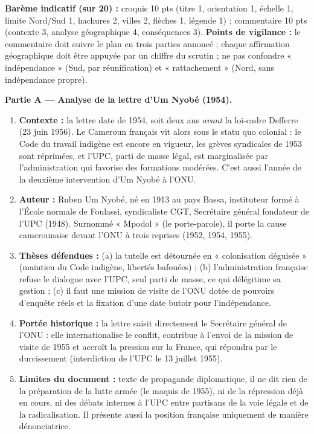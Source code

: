 \documentclass[11pt]{article}
\begin{document}
\begin{corrige}
\textbf{Barème indicatif (sur 20) :} croquis 10 pts (titre 1, orientation 1, échelle 1, limite Nord/Sud 1, hachures 2, villes 2, flèches 1, légende 1) ; commentaire 10 pts (contexte 3, analyse géographique 4, conséquences 3).
\textbf{Points de vigilance :} le commentaire doit suivre le plan en trois parties annoncé ; chaque affirmation géographique doit être appuyée par un chiffre du scrutin ; ne pas confondre « indépendance » (Sud, par réunification) et « rattachement » (Nord, sans indépendance propre).
\end{corrige}

\begin{corrige}
\textbf{Partie A — Analyse de la lettre d'Um Nyobé (1954).}
\begin{enumerate}
\item \textbf{Contexte :} la lettre date de 1954, soit deux ans \emph{avant} la loi-cadre Defferre (23 juin 1956). Le Cameroun français vit alors sous le statu quo colonial : le Code du travail indigène est encore en vigueur, les grèves syndicales de 1953 sont réprimées, et l'UPC, parti de masse légal, est marginalisée par l'administration qui favorise des formations modérées. C'est aussi l'année de la deuxième intervention d'Um Nyobé à l'ONU.
\item \textbf{Auteur :} Ruben Um Nyobé, né en 1913 au pays Bassa, instituteur formé à l'École normale de Foulassi, syndicaliste CGT, Secrétaire général fondateur de l'UPC (1948). Surnommé « Mpodol » (le porte-parole), il porte la cause camerounaise devant l'ONU à trois reprises (1952, 1954, 1955).
\item \textbf{Thèses défendues :} (a) la tutelle est détournée en « colonisation déguisée » (maintien du Code indigène, libertés bafouées) ; (b) l'administration française refuse le dialogue avec l'UPC, seul parti de masse, ce qui délégitime sa gestion ; (c) il faut une mission de visite de l'ONU dotée de pouvoirs d'enquête réels et la fixation d'une date butoir pour l'indépendance.
\item \textbf{Portée historique :} la lettre saisit directement le Secrétaire général de l'ONU : elle internationalise le conflit, contribue à l'envoi de la mission de visite de 1955 et accroît la pression sur la France, qui répondra par le durcissement (interdiction de l'UPC le 13 juillet 1955).
\item \textbf{Limites du document :} texte de propagande diplomatique, il ne dit rien de la préparation de la lutte armée (le maquis de 1955), ni de la répression déjà en cours, ni des débats internes à l'UPC entre partisans de la voie légale et de la radicalisation. Il présente aussi la position française uniquement de manière dénonciatrice.
\end{enumerate}


\end{corrige}
\end{document}
